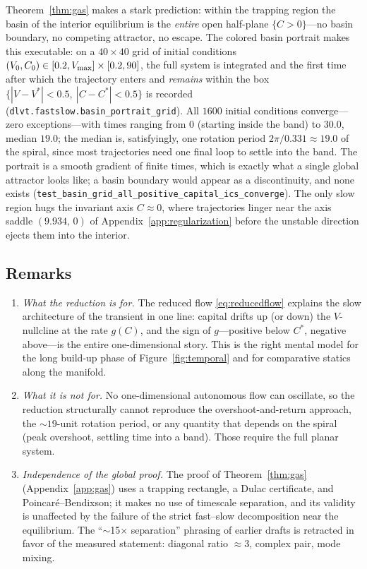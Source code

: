Theorem~\ref{thm:gas} makes a stark prediction: within the trapping
region the basin of the interior equilibrium is the \emph{entire} open
half-plane $\{C>0\}$---no basin boundary, no competing attractor, no
escape. The colored basin portrait makes this executable: on a
$40\times40$ grid of initial conditions
$(V_{0},C_{0})\in[0.2,V_{\max}]\times[0.2,90]$, the full system is
integrated and the first time after which the trajectory enters and
\emph{remains} within the box $\{|V-V^{*}|<0.5,\ |C-C^{*}|<0.5\}$ is
recorded (\texttt{dlvt.fastslow.basin\_portrait\_grid}). All $1600$
initial conditions converge---zero exceptions---with times ranging from
$0$ (starting inside the band) to $30.0$, median $19.0$; the median is,
satisfyingly, one rotation period $2\pi/0.331\approx19.0$ of the spiral,
since most trajectories need one final loop to settle into the band. The
portrait is a smooth gradient of finite times, which is exactly what a
single global attractor looks like; a basin boundary would appear as a
discontinuity, and none exists
(\texttt{test\_basin\_grid\_all\_positive\_capital\_ics\_converge}).
The only slow region hugs the invariant axis $C\approx0$, where
trajectories linger near the axis saddle $(9.934,\,0)$ of
Appendix~\ref{app:regularization} before the unstable direction ejects
them into the interior.

\subsection{Remarks}

\begin{enumerate}
\item \emph{What the reduction is for.} The reduced flow
\eqref{eq:reducedflow} explains the slow architecture of the transient
in one line: capital drifts up (or down) the $V$-nullcline at the rate
$g(C)$, and the sign of $g$---positive below $C^{*}$, negative
above---is the entire one-dimensional story. This is the right mental
model for the long build-up phase of Figure~\ref{fig:temporal} and for
comparative statics along the manifold.
\item \emph{What it is not for.} No one-dimensional autonomous flow can
oscillate, so the reduction structurally cannot reproduce the
overshoot-and-return approach, the $\sim19$-unit rotation period, or any
quantity that depends on the spiral (peak overshoot, settling time into
a band). Those require the full planar system.
\item \emph{Independence of the global proof.} The proof of
Theorem~\ref{thm:gas} (Appendix~\ref{app:gas}) uses a trapping rectangle,
a Dulac certificate, and Poincar\'e--Bendixson; it makes no use of
timescale separation, and its validity is unaffected by the failure of
the strict fast--slow decomposition near the equilibrium. The
``$\sim$15$\times$ separation'' phrasing of earlier drafts is retracted
in favor of the measured statement: diagonal ratio $\approx3$, complex
pair, mode mixing.
\end{enumerate}

